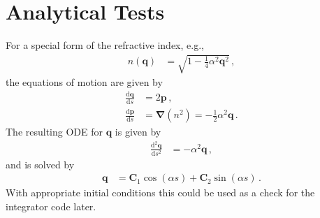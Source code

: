 \documentclass[12pt,a4paper,twoside,openright,BCOR10mm,headsepline,titlepage,abstracton,chapterprefix,final]{scrreprt}
\newcommand\Vector[1]{{\mathbf{#1}}}
\begin{document}
\section{Analytical Tests}

For a special form of the refractive index, e.g.,
\begin{align}
 n(\Vector{q}) &= \sqrt{1 - \frac{1}{4} \alpha^2 \Vector{q}^2}\,,
\end{align}
the equations of motion are given by
\begin{align}
 \frac{\text{d}\Vector{q}}{\text{d}s} &=  2 \Vector{p}\,,\\
 \frac{\text{d}\Vector{p}}{\text{d}s} &= \Vector{\nabla}(n^2) = -\frac{1}{2}\alpha^2 \Vector{q}\,. 
\end{align}
The resulting ODE for $\Vector{q}$ is given by
\begin{align}
 \frac{\text{d}^2\Vector{q}}{\text{d}s^2} &= -\alpha^2 \Vector{q}\,,
\end{align}
and is solved by
\begin{align}
 \Vector{q} &= \Vector{C}_1 \cos(\alpha s) + \Vector{C}_2 \sin(\alpha s)\,.
\end{align}
With appropriate initial conditions this could be used as a check for the integrator code later.
\end{document}
